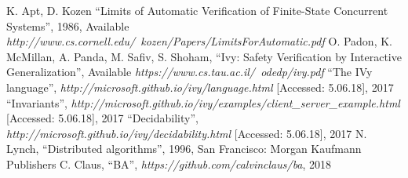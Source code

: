 \documentclass[fleqn]{article}
\begin{document}
\begin{thebibliography}{99}
     K. Apt, D. Kozen ``Limits of Automatic Verification of Finite-State Concurrent Systems'', 1986, Available \textit{http://www.cs.cornell.edu/~kozen/Papers/LimitsForAutomatic.pdf}
     O. Padon, K. McMillan, A. Panda, M. Safiv, S. Shoham, ``Ivy: Safety Verification by Interactive Generalization'', Available \textit{https://www.cs.tau.ac.il/~odedp/ivy.pdf}
     ``The IVy language'',  \textit{http://microsoft.github.io/ivy/language.html} [Accessed: 5.06.18], 2017
     ``Invariants'',  \textit{http://microsoft.github.io/ivy/examples/client\_server\_example.html} [Accessed: 5.06.18], 2017
     ``Decidability'',  \textit{http://microsoft.github.io/ivy/decidability.html} [Accessed: 5.06.18], 2017
     N. Lynch, ``Distributed algorithms'', 1996, San Francisco: Morgan Kaufmann Publishers
     C. Claus, ``BA'', \textit{https://github.com/calvinclaus/ba}, 2018
\end{thebibliography}

\end{document}
